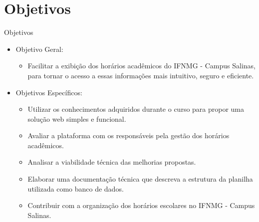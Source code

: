 \section{Objetivos}

\begin{frame}{Objetivos}
    \begin{itemize}
        \item Objetivo Geral: \vspace{0.1cm}
              \begin{itemize}
                  \item Facilitar a exibição dos horários acadêmicos do IFNMG - Campus Salinas, para tornar o acesso a essas informações mais intuitivo, seguro e eficiente. \vspace{0.2cm}
              \end{itemize}
        \item Objetivos Específicos: \vspace{0.1cm}
              \begin{itemize}
                  \item Utilizar os conhecimentos adquiridos durante o curso para propor uma solução web simples e funcional. \vspace{0.1cm}
                  \item Avaliar a plataforma com os responsáveis pela gestão dos horários acadêmicos. \vspace{0.1cm}
                  \item Analisar a viabilidade técnica das melhorias propostas. \vspace{0.1cm}
                  \item Elaborar uma documentação técnica que descreva a estrutura da planilha utilizada como banco de dados. \vspace{0.1cm}
                  \item Contribuir com a organização dos horários escolares no IFNMG - Campus Salinas. \vspace{0.1cm}
              \end{itemize}
    \end{itemize}
\end{frame}
